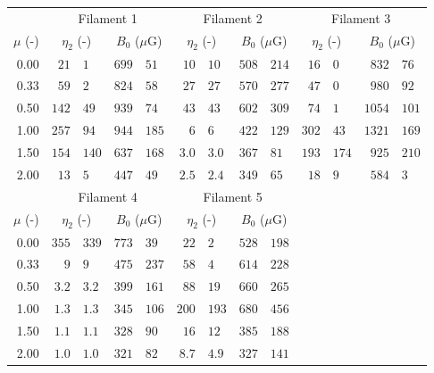 \begin{tabular}{@{}rr@{ $\pm$ }lr@{ $\pm$ }lr@{ $\pm$ }lr@{ $\pm$ }lr@{ $\pm$ }lr@{ $\pm$ }l@{}}
\toprule
{} & \multicolumn{4}{c}{Filament 1}
   & \multicolumn{4}{c}{Filament 2}
   & \multicolumn{4}{c}{Filament 3} \\
\cmidrule(lr){2-5} \cmidrule(lr){6-9} \cmidrule(lr){10-13}
$\mu$ (-) & \multicolumn{2}{c}{$\eta_2$ (-)} & \multicolumn{2}{c}{$B_0$ ($\mu$G)}
          & \multicolumn{2}{c}{$\eta_2$ (-)} & \multicolumn{2}{c}{$B_0$ ($\mu$G)}
          & \multicolumn{2}{c}{$\eta_2$ (-)} & \multicolumn{2}{c}{$B_0$ ($\mu$G)} \\
\cmidrule{1-13}
0.00 & $21$ & $1$ & $699$ & $51$
     & $10$ & $10$ & $508$ & $214$
     & $16$ & $0$ & $832$ & $76$ \\
0.33 & $59$ & $2$ & $824$ & $58$
     & $27$ & $27$ & $570$ & $277$
     & $47$ & $0$ & $980$ & $92$ \\
0.50 & $142$ & $49$ & $939$ & $74$
     & $43$ & $43$ & $602$ & $309$
     & $74$ & $1$ & $1054$ & $101$ \\
1.00 & $257$ & $94$ & $944$ & $185$
     & $6$ & $6$ & $422$ & $129$
     & $302$ & $43$ & $1321$ & $169$ \\
1.50 & $154$ & $140$ & $637$ & $168$
     & $3.0$ & $3.0$ & $367$ & $81$
     & $193$ & $174$ & $925$ & $210$ \\
2.00 & $13$ & $5$ & $447$ & $49$
     & $2.5$ & $2.4$ & $349$ & $65$
     & $18$ & $9$ & $584$ & $3$ \\

\midrule
{} & \multicolumn{4}{c}{Filament 4}
   & \multicolumn{4}{c}{Filament 5} \\
\cmidrule(lr){2-5} \cmidrule(lr){6-9}
$\mu$ (-) & \multicolumn{2}{c}{$\eta_2$ (-)} & \multicolumn{2}{c}{$B_0$ ($\mu$G)}
          & \multicolumn{2}{c}{$\eta_2$ (-)} & \multicolumn{2}{c}{$B_0$ ($\mu$G)} \\
\cmidrule{1-9}
0.00 & $355$ & $339$ & $773$ & $39$
     & $22$ & $2$ & $528$ & $198$ \\
0.33 & $9$ & $9$ & $475$ & $237$
     & $58$ & $4$ & $614$ & $228$ \\
0.50 & $3.2$ & $3.2$ & $399$ & $161$
     & $88$ & $19$ & $660$ & $265$ \\
1.00 & $1.3$ & $1.3$ & $345$ & $106$
     & $200$ & $193$ & $680$ & $456$ \\
1.50 & $1.1$ & $1.1$ & $328$ & $90$
     & $16$ & $12$ & $385$ & $188$ \\
2.00 & $1.0$ & $1.0$ & $321$ & $82$
     & $8.7$ & $4.9$ & $327$ & $141$ \\

\bottomrule
\end{tabular}
